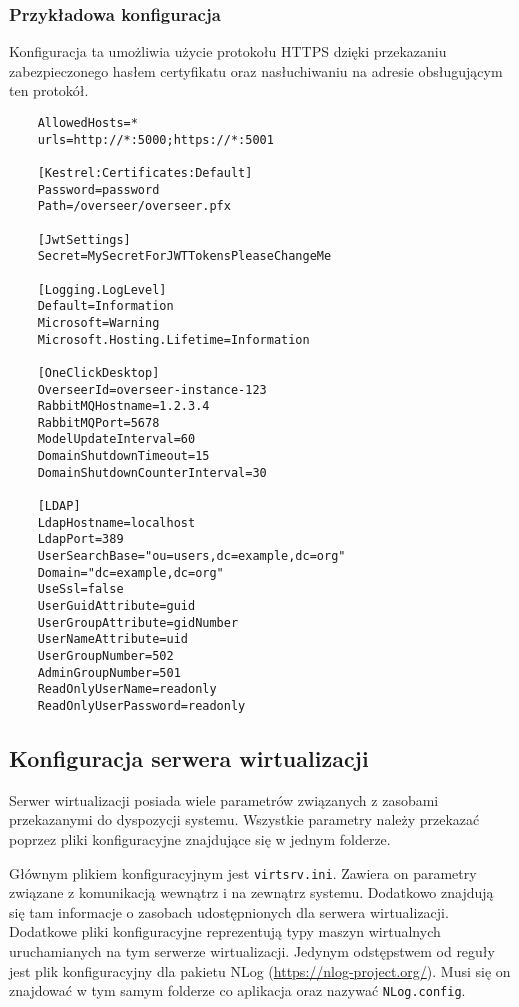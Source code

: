 \documentclass[../opis-rozwiazania.tex]{subfiles}
\begin{document}
\subsubsection{Przykładowa konfiguracja}

Konfiguracja ta umożliwia użycie protokołu HTTPS dzięki przekazaniu zabezpieczonego hasłem certyfikatu oraz nasłuchiwaniu na adresie obsługującym ten protokół.

\begin{verbatim}
	AllowedHosts=*
	urls=http://*:5000;https://*:5001

	[Kestrel:Certificates:Default]
	Password=password
	Path=/overseer/overseer.pfx

	[JwtSettings]
	Secret=MySecretForJWTTokensPleaseChangeMe

	[Logging.LogLevel]
	Default=Information
	Microsoft=Warning
	Microsoft.Hosting.Lifetime=Information

	[OneClickDesktop]
	OverseerId=overseer-instance-123
	RabbitMQHostname=1.2.3.4
	RabbitMQPort=5678
	ModelUpdateInterval=60
	DomainShutdownTimeout=15
	DomainShutdownCounterInterval=30

	[LDAP]
	LdapHostname=localhost
	LdapPort=389
	UserSearchBase="ou=users,dc=example,dc=org"
	Domain="dc=example,dc=org"
	UseSsl=false
	UserGuidAttribute=guid
	UserGroupAttribute=gidNumber
	UserNameAttribute=uid
	UserGroupNumber=502
	AdminGroupNumber=501
	ReadOnlyUserName=readonly
	ReadOnlyUserPassword=readonly
\end{verbatim}

\subsection{Konfiguracja serwera wirtualizacji}
\label{system_startup.virtsrv_conf}
Serwer wirtualizacji posiada wiele parametrów związanych z zasobami przekazanymi do dyspozycji systemu.
Wszystkie parametry należy przekazać poprzez pliki konfiguracyjne znajdujące się w jednym folderze.

Głównym plikiem konfiguracyjnym jest \texttt{virtsrv.ini}.
Zawiera on parametry związane z komunikacją wewnątrz i na zewnątrz systemu.
Dodatkowo znajdują się tam informacje o zasobach udostępnionych dla serwera wirtualizacji.
Dodatkowe pliki konfiguracyjne reprezentują typy maszyn wirtualnych uruchamianych na tym serwerze wirtualizacji.
Jedynym odstępstwem od reguły jest plik konfiguracyjny dla pakietu NLog (\url{https://nlog-project.org/}).
Musi się on znajdować w tym samym folderze co aplikacja oraz nazywać \texttt{NLog.config}.
\end{document}
